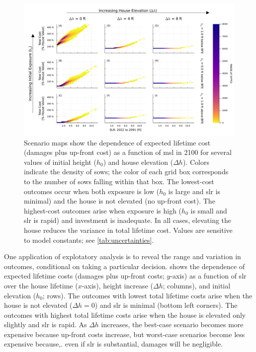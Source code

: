 \documentclass[11pt]{article}
\begin{document}
\begin{figure}
    \includegraphics[width=\textwidth]{scenario-map-slr-cost}
    \caption{
        Scenario maps show the dependence of expected lifetime cost (damages plus up-front cost) as a function of \gls{msl} in 2100 for several values of initial height ($h_0$) and house elevation ($\Delta h$).
        Colors indicate the density of \glspl{sow}; the color of each grid box corresponds to the number of \glspl{sow} falling within that box.
        The lowest-cost outcomes occur when both exposure is low ($h_0$ is large and \gls{slr} is minimal) and the house is not elevated (no up-front cost).
        The highest-cost outcomes arise when exposure is high ($h_0$ is small and \gls{slr} is rapid) and investment is inadequate.
        In all cases, elevating the house reduces the variance in total lifetime cost.
        Values are sensitive to model constants; see \cref{tab:uncertainties}.
    }\label{fig:scenario-map-slr-cost}
\end{figure}

One application of explotatory analysis is to reveal the range and variation in outcomes, conditional on taking a particular decision.
 shows the dependence of expected lifetime costs (damages plus up-front costs; $y$-axis) as a function of  \gls{slr} over the house lifetime ($x$-axis), height increase ($\Delta h$; columns), and initial elevation ($h_0$; rows).
The outcomes with lowest total lifetime costs arise when the house is not elevated ($\Delta h = 0$) and \gls{slr} is minimal (bottom left corners).
The outcomes with highest total lifetime costs arise when the house is elevated only slightly and \gls{slr} is rapid.
As $\Delta h$ increases, the best-case scenario becomes more expensive because up-front costs increase, but worst-case scenarios become less expensive because,. even if \gls{slr} is substantial, damages will be negligible.
\end{document}
